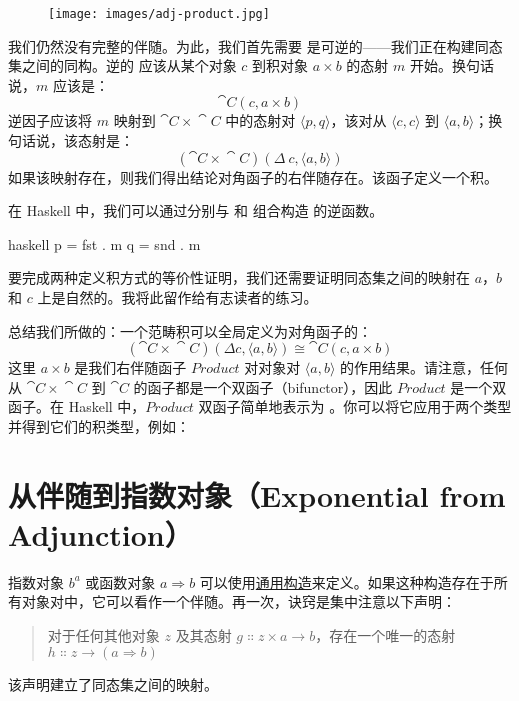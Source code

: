 \begin{figure}[H]
  \centering
  \texttt{[image: images/adj-product.jpg]}
\end{figure}

\noindent
我们仍然没有完整的伴随。为此，我们首先需要  是可逆的——我们正在构建同态集之间的同构。逆的  应该从某个对象 $c$ 到积对象 $a\times{}b$ 的态射 $m$ 开始。换句话说，$m$ 应该是：
\[\cat{C}(c, a\times{}b)\]
逆因子应该将 $m$ 映射到 $\cat{C}\times{}\cat{C}$ 中的态射对 $\langle p, q \rangle$，该对从 $\langle c, c \rangle$ 到 $\langle a, b \rangle$；换句话说，该态射是：
\[(\cat{C}\times{}\cat{C})(\Delta\ c, \langle a, b \rangle)\]
如果该映射存在，则我们得出结论对角函子的右伴随存在。该函子定义一个积。

在 Haskell 中，我们可以通过分别与  和  组合构造  的逆函数。

\begin{snip}{haskell}
  p = fst . m
  q = snd . m
\end{snip}
要完成两种定义积方式的等价性证明，我们还需要证明同态集之间的映射在 $a$，$b$ 和 $c$ 上是自然的。我将此留作给有志读者的练习。

总结我们所做的：一个范畴积可以全局定义为对角函子的：
\[(\cat{C}\times{}\cat{C})(\Delta c, \langle a, b \rangle) \cong \cat{C}(c, a\times{}b)\]
这里 $a\times{}b$ 是我们右伴随函子 $\mathit{Product}$ 对对象对 $\langle a, b \rangle$ 的作用结果。请注意，任何从 $\cat{C}\times{}\cat{C}$ 到 $\cat{C}$ 的函子都是一个双函子（bifunctor），因此 $\mathit{Product}$ 是一个双函子。在 Haskell 中，$\mathit{Product}$ 双函子简单地表示为 \code{(,)}。你可以将它应用于两个类型并得到它们的积类型，例如：


\section{从伴随到指数对象（Exponential from Adjunction）}

指数对象 $b^a$ 或函数对象 $a \Rightarrow b$ 可以使用\hyperref[function-types]{通用构造}来定义。如果这种构造存在于所有对象对中，它可以看作一个伴随。再一次，诀窍是集中注意以下声明：

\begin{quote}
  对于任何其他对象 $z$ 及其态射 $g \Colon z\times{}a \to b$，存在一个唯一的态射 $h \Colon z \to (a \Rightarrow b)$
\end{quote}
该声明建立了同态集之间的映射。

